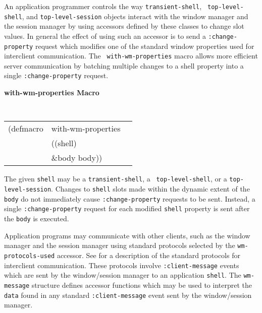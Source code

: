 
An application programmer controls the way {\tt transient-shell}, {\tt
top-level-shell}, and {\tt top-level-session} objects interact with the
window manager and the session manager by using accessors defined by
these classes to change slot values.  In general the effect of using
such an accessor is to send a {\tt :change-property} request which modifies one
of the standard window properties used for interclient
communication. 
The {\tt
with-wm-properties} macro allows more efficient server communication by
batching multiple changes to a shell property into a single
{\tt :change-property} request.

{\samepage
{\large {\bf with-wm-properties \hfill Macro}} 
\begin{flushright} \parbox[t]{6.125in}{
\tt
\begin{tabular}{lll}
\raggedright
(defmacro & with-wm-properties & \\ 
& ((shell)\\
& \&body body))
\end{tabular}
\rm

}\end{flushright}}

\begin{flushright} \parbox[t]{6.125in}{
The given {\tt shell} may be a {\tt transient-shell}, a {\tt
top-level-shell}, or a {\tt top-level-session}. Changes to {\tt shell}
slots made within the dynamic extent of the {\tt body} do not
immediately cause {\tt :change-property} requests to be sent. Instead, a single
{\tt :change-property} request for each modified {\tt shell} property is sent
after the {\tt body} is executed.

}\end{flushright}

Application
programs may communicate with other clients, such as the window manager and the
session manager  using standard
protocols selected by the {\tt wm-protocols-used}
accessor.  See \cite{icccm} for a description of the standard protocols for
interclient communication.  These protocols involve {\tt :client-message} events
which are sent by the window/session manager to an application {\tt shell}.  The
{\tt wm-message} structure defines accessor functions which may be used to
interpret the
{\tt data} found in any standard {\tt :client-message} event sent by the
window/session manager.

